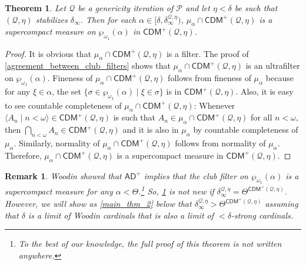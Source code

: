 \documentclass{amsart}
\newtheorem{thm}[dfn]{Theorem}
\newtheorem{rem}[dfn]{Remark}
\newcommand{\power}{\wp}
\begin{document}
\begin{thm}\label{spct_meas_in_CDM_plus}
    Let $\mathcal{Q}$ be a genericity iteration of $\mathcal{P}$ and let $\eta<\delta$ be such that $(\mathcal{Q}, \eta)$ stabilizes $\delta_{\infty}$.
    Then for each $\alpha\in[\delta, \delta^{\mathcal{Q}, \eta}_{\infty})$, $\mu_{\alpha}\cap\mathsf{CDM}^{+}(\mathcal{Q}, \eta)$ is a supercompact measure on $\power_{\omega_1}(\alpha)$ in $\mathsf{CDM}^{+}(\mathcal{Q}, \eta)$.
\end{thm}
\begin{proof}
    It is obvious that $\mu_{\alpha}\cap\mathsf{CDM}^{+}(\mathcal{Q}, \eta)$ is a filter.
    The proof of \cref{agreement_between_club_filters} shows that $\mu_{\alpha}\cap\mathsf{CDM}^{+}(\mathcal{Q}, \eta)$ is an ultrafilter on $\power_{\omega_1}(\alpha)$. Fineness of $\mu_{\alpha}\cap\mathsf{CDM}^{+}(\mathcal{Q}, \eta)$ follows from fineness of $\mu_{\alpha}$ because for any $\xi\in\alpha$, the set $\{\sigma\in\power_{\omega_1}(\alpha)\mid\xi\in\sigma\}$ is in $\mathsf{CDM}^+(\mathcal{Q}, \eta)$. 
    Also, it is easy to see countable completeness of $\mu_{\alpha}\cap\mathsf{CDM}^{+}(\mathcal{Q}, \eta)$: Whenever $\langle A_n\mid n<\omega\rangle\in\mathsf{CDM}^+(\mathcal{Q}, \eta)$ is such that $A_n\in\mu_{\alpha}\cap\mathsf{CDM}^{+}(\mathcal{Q}, \eta)$ for all $n<\omega$, then $\bigcap_{n<\omega}A_n\in\mathsf{CDM}^+(\mathcal{Q}, \eta)$ and it is also in $\mu_{\alpha}$ by countable completeness of $\mu_{\alpha}$.
    Similarly, normality of $\mu_{\alpha}\cap\mathsf{CDM}^{+}(\mathcal{Q}, \eta)$ follows from normality of $\mu_{\alpha}$.
    Therefore, $\mu_{\alpha}\cap\mathsf{CDM}^{+}(\mathcal{Q}, \eta)$ is a supercompact measure in $\mathsf{CDM}^+(\mathcal{Q}, \eta)$.
\end{proof}

\begin{rem}
    Woodin showed that $\mathsf{AD}^+$ implies that the club filter on $\power_{\omega_1}(\alpha)$ is a supercompact measure for any $\alpha<\Theta$.\footnote{To the best of our knowledge, the full proof of this theorem is not written anywhere.}
    So, \cref{spct_meas_in_CDM_plus} is not new if $\delta^{\mathcal{Q}, \eta}_{\infty}=\Theta^{\mathsf{CDM}^{+}(\mathcal{Q}, \eta)}$.
    However, we will show as \cref{main_thm_2} below that $\delta^{\mathcal{Q}, \eta}_{\infty}>\Theta^{\mathsf{CDM}^{+}(\mathcal{Q}, \eta)}$ assuming that $\delta$ is a limit of Woodin cardinals that is also a limit of ${<}\delta$-strong cardinals.
\end{rem}
\end{document}
